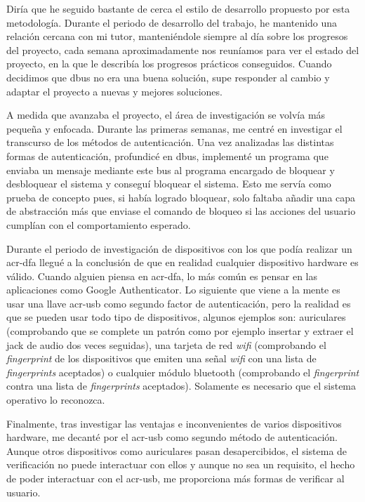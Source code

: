 \documentclass[titlepage, 12pt, a4paper]{article}
\begin{document}
Diría que he seguido bastante de cerca el estilo de desarrollo propuesto por esta metodología. Durante el periodo de desarrollo del trabajo, he mantenido una relación cercana con mi tutor, manteniéndole siempre al día sobre los progresos del proyecto, cada semana aproximadamente nos reuníamos para ver el estado del proyecto, en la que le describía los progresos prácticos conseguidos. Cuando decidimos que \gls{dbus} no era una buena solución, supe responder al cambio y adaptar el proyecto a nuevas y mejores soluciones. \par
A medida que avanzaba el proyecto, el área de investigación se volvía más pequeña y enfocada. Durante las primeras semanas, me centré en investigar el transcurso de los métodos de autenticación. Una vez analizadas las distintas formas de autenticación, profundicé en \gls{dbus}, implementé un programa que enviaba un mensaje mediante este bus al programa encargado de bloquear y desbloquear el sistema y conseguí bloquear el sistema. Esto me servía como prueba de concepto pues, si había logrado bloquear, solo faltaba añadir una capa de abstracción más que enviase el comando de bloqueo si las acciones del usuario cumplían con el comportamiento esperado. \par
Durante el periodo de investigación de dispositivos con los que podía realizar un \gls{acr-dfa} llegué a la conclusión de que en realidad cualquier dispositivo hardware es válido. Cuando alguien piensa en \gls{acr-dfa}, lo más común es pensar en las aplicaciones como Google Authenticator. Lo siguiente que viene a la mente es usar una llave \gls{acr-usb} como segundo factor de autenticación, pero la realidad es que se pueden usar todo tipo de dispositivos, algunos ejemplos son: auriculares (comprobando que se complete un patrón como por ejemplo insertar y extraer el jack de audio dos veces seguidas), una tarjeta de red \textit{\gls{wifi}} (comprobando  el \textit{\gls{fingerprint}} de los dispositivos que emiten una señal \textit{\gls{wifi}} con una lista de \textit{\gls{fingerprint}s} aceptados) o cualquier módulo \gls{bluetooth} (comprobando el \textit{\gls{fingerprint}} contra una lista de \textit{\gls{fingerprint}s} aceptados). Solamente es necesario que el sistema operativo lo reconozca. \par
Finalmente, tras investigar las ventajas e inconvenientes de varios dispositivos hardware, me decanté por el \gls{acr-usb} como segundo método de autenticación. Aunque otros dispositivos como auriculares pasan desapercibidos, el sistema de verificación no puede interactuar con ellos y aunque no sea un requisito, el hecho de poder interactuar con el \gls{acr-usb}, me proporciona más formas de verificar al usuario.
\clearpage
\end{document}
